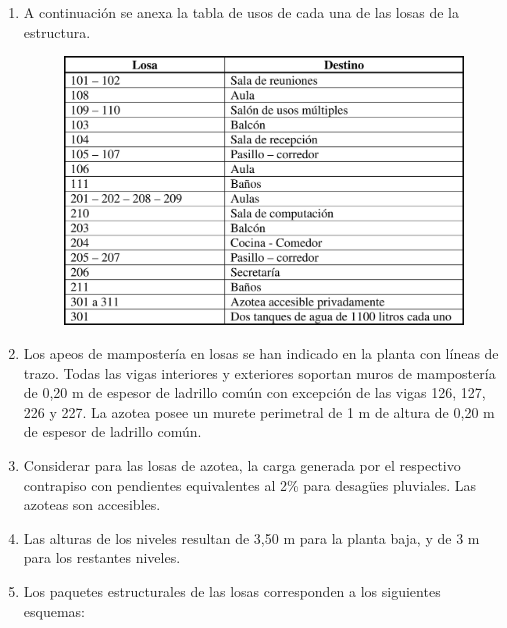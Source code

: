 \begin{enumerate}
\item A continuación se anexa la tabla de usos de cada una de las losas de la estructura.
\begin{figure}[H]
\begin{center}
     \includegraphics[scale = 0.8]{chapters/chapter_1/images/tabla_de_usos.png}
\end{center}
\end{figure}
\item Los apeos de mampostería en losas se han indicado en la planta con líneas de trazo. Todas las vigas
interiores y exteriores soportan muros de mampostería de 0,20 m de espesor de ladrillo común con
excepción de las vigas 126, 127, 226 y 227. La azotea posee un murete perimetral de 1 m de altura de
0,20 m de espesor de ladrillo común.
\item Considerar para las losas de azotea, la carga generada por el respectivo contrapiso con pendientes
equivalentes al 2\% para desagües pluviales. Las azoteas son accesibles.
\item Las alturas de los niveles resultan de 3,50 m para la planta baja, y de 3 m para los restantes niveles.
\item Los paquetes estructurales de las losas corresponden a los siguientes esquemas:
\begin{figure}[H]
\begin{center}

\end{center}
\end{figure}
\end{enumerate}
